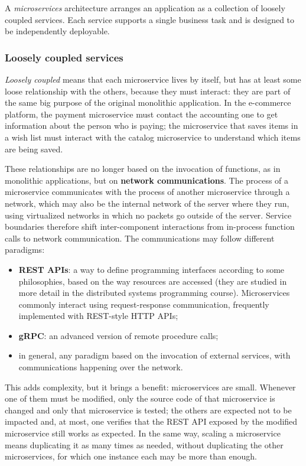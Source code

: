 A \emph{microservices} architecture arranges an application as a collection of loosely coupled services. Each service supports a single business task and is designed to be independently deployable.

\subsubsection*{Loosely coupled services}

\emph{Loosely coupled} means that each microservice lives by itself, but has at least some loose relationship with the others, because they must interact: they are part of the same big purpose of the original monolithic application. In the e-commerce platform, the payment microservice must contact the accounting one to get information about the person who is paying; the microservice that saves items in a wish list must interact with the catalog microservice to understand which items are being saved.

These relationships are no longer based on the invocation of functions, as in monolithic applications, but on \textbf{network communications}. The process of a microservice communicates with the process of another microservice through a network, which may also be the internal network of the server where they run, using virtualized networks in which no packets go outside of the server. Service boundaries therefore shift inter-component interactions from in-process function calls to network communication. The communications may follow different paradigms:

\begin{itemize}
\item \textbf{REST APIs}: a way to define programming interfaces according to some philosophies, based on the way resources are accessed (they are studied in more detail in the distributed systems programming course). Microservices commonly interact using request-response communication, frequently implemented with REST-style HTTP APIs;
\item \textbf{gRPC}: an advanced version of remote procedure calls;
\item in general, any paradigm based on the invocation of external services, with communications happening over the network.
\end{itemize}

This adds complexity, but it brings a benefit: microservices are small. Whenever one of them must be modified, only the source code of that microservice is changed and only that microservice is tested; the others are expected not to be impacted and, at most, one verifies that the REST API exposed by the modified microservice still works as expected. In the same way, scaling a microservice means duplicating it as many times as needed, without duplicating the other microservices, for which one instance each may be more than enough.

